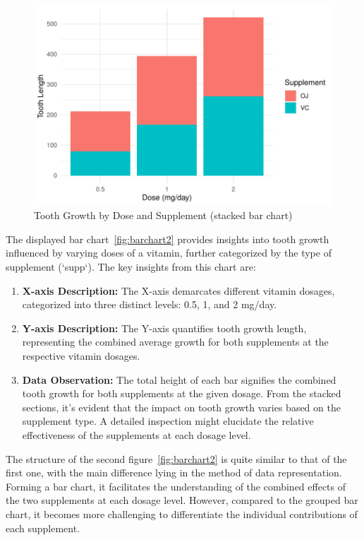 \documentclass{article}\usepackage[]{graphicx}\usepackage[]{xcolor}
\newenvironment{knitrout}{}{} %
\begin{document}
\begin{figure}[htbp]
\begin{minipage}[b]{0.45\linewidth}
\begin{knitrout}
{\centering \includegraphics[width=\linewidth]{figure/beamer-barchart3-1} 

}


\end{knitrout}
    \caption{Tooth Growth by Dose and Supplement (stacked bar chart)}
    \label{fig:barchart3}
  \end{minipage}
\end{figure}
The displayed bar chart~\ref{fig:barchart2} provides insights into tooth growth influenced by varying doses of a vitamin, further categorized by the type of supplement (`supp`). The key insights from this chart are:

\begin{enumerate}
    \item \textbf{X-axis Description:} The X-axis demarcates different vitamin dosages, categorized into three distinct levels: 0.5, 1, and 2 mg/day.
    
    \item \textbf{Y-axis Description:} The Y-axis quantifies tooth growth length, representing the combined average growth for both supplements at the respective vitamin dosages.
    \item \textbf{Data Observation:} The total height of each bar signifies the combined tooth growth for both supplements at the given dosage. From the stacked sections, it's evident that the impact on tooth growth varies based on the supplement type. A detailed inspection might elucidate the relative effectiveness of the supplements at each dosage level.
\end{enumerate}
The structure of the second figure~\ref{fig:barchart2} is quite similar to that of the first one, with the main difference lying in the method of data representation. Forming a bar chart, it facilitates the understanding of the combined effects of the two supplements at each dosage level. However, compared to the grouped bar chart, it becomes more challenging to differentiate the individual contributions of each supplement.
\end{document}
